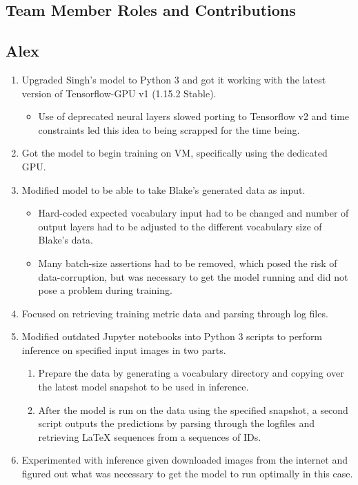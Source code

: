 \documentclass[12pt]{article}
\begin{document}
\begin{appendix}
  \section{Team Member Roles and Contributions}
    \subsection{Alex}
      \begin{enumerate}
        \item Upgraded Singh's model to Python 3 and got it working with the
        latest version of Tensorflow-GPU v1 (1.15.2 Stable).
        \begin{itemize}
          \item Use of deprecated neural layers slowed porting to Tensorflow v2
          and time constraints led this idea to being scrapped for the time
          being. 
        \end{itemize}
        \item Got the model to begin training on VM, specifically using the dedicated GPU. 
        \item Modified model to be able to take Blake's generated data as input.
        \begin{itemize}
          \item Hard-coded expected vocabulary input had to be changed and number
          of output layers had to be adjusted to the different vocabulary
          size of Blake's data.
          \item Many batch-size assertions had to be removed, which posed the
          risk of data-corruption, but was necessary to get the model running
          and did not pose a problem during training.
        \end{itemize}
        \item Focused on retrieving training metric data and parsing through log files.
        \item Modified outdated Jupyter notebooks into Python 3 scripts to
        perform inference on specified input images in two parts.
        \begin{enumerate}
          \item Prepare the data by generating a vocabulary directory and
          copying over the latest model snapshot to be used in inference.
          \item After the model is run on the data using the specified snapshot,
          a second script outputs the predictions by parsing through the
          logfiles and retrieving \LaTeX{} sequences from a sequences of IDs.
        \end{enumerate}
        \item Experimented with inference given downloaded images from the
        internet and figured out what was necessary to get the model to run
        optimally in this case.
      \end{enumerate}

\end{appendix}
\end{document}

